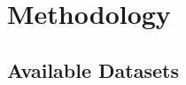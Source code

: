 \documentclass[report.tex]{subfiles}
\begin{document}
    \chapter{Methodology}
    \section{Available Datasets}

\end{document}
